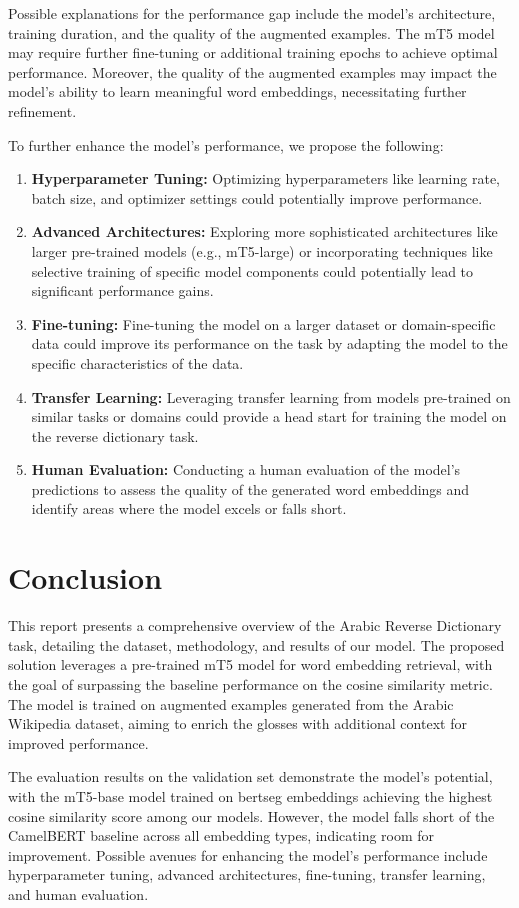 \documentclass[15pt]{article}
\begin{document}
Possible explanations for the performance gap include the model's architecture, training duration, and the quality of the augmented examples. The mT5 model may require further fine-tuning or additional training epochs to achieve optimal performance. Moreover, the quality of the augmented examples may impact the model's ability to learn meaningful word embeddings, necessitating further refinement.

To further enhance the model's performance, we propose the following:
\begin{enumerate}
    \item \textbf{Hyperparameter Tuning:} Optimizing hyperparameters like learning rate, batch size, and optimizer settings could potentially improve performance.
    \item \textbf{Advanced Architectures:} Exploring more sophisticated architectures like larger pre-trained models (e.g., mT5-large) or incorporating techniques like selective training of specific model components could potentially lead to significant performance gains.
    \item \textbf{Fine-tuning:} Fine-tuning the model on a larger dataset or domain-specific data could improve its performance on the task by adapting the model to the specific characteristics of the data.
    \item \textbf{Transfer Learning:} Leveraging transfer learning from models pre-trained on similar tasks or domains could provide a head start for training the model on the reverse dictionary task.
    \item \textbf{Human Evaluation:} Conducting a human evaluation of the model's predictions to assess the quality of the generated word embeddings and identify areas where the model excels or falls short.
\end{enumerate} 

\newpage

\section*{Conclusion}

This report presents a comprehensive overview of the Arabic Reverse Dictionary task, detailing the dataset, methodology, and results of our model. The proposed solution leverages a pre-trained mT5 model for word embedding retrieval, with the goal of surpassing the baseline performance on the cosine similarity metric. The model is trained on augmented examples generated from the Arabic Wikipedia dataset, aiming to enrich the glosses with additional context for improved performance.

The evaluation results on the validation set demonstrate the model's potential, with the mT5-base model trained on bertseg embeddings achieving the highest cosine similarity score among our models. However, the model falls short of the CamelBERT baseline across all embedding types, indicating room for improvement. Possible avenues for enhancing the model's performance include hyperparameter tuning, advanced architectures, fine-tuning, transfer learning, and human evaluation.

\newpage

\printbibliography[title={References}]\label{lastpage}
\end{document}
